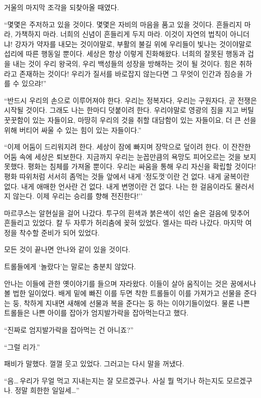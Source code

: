 거울의 마지막 조각을 되찾아올 때였다.

``몇몇은 주저하고 있을 것이다. 몇몇은 자비의 마음을 품고 있을 것이다. 흔들리지 마라, 가책하지 마라. 너희의 신념이 흔들리게 두지 마라. 이것이 자연의 법칙이 아니더냐! 강자가 약자를 내모는 것이야말로, 부활의 불길 위에 우리들이 빛나는 것이야말로 섭리에 따른 행동일 뿐이다. 세상은 항상 이렇게 진화해왔다. 너희의 잘못된 행동과 겁을 내는 것이 우리 왕국의, 우리 백성들의 성장을 방해하는 것이 될 것이다. 힘은 취하라고 존재하는 것이다! 우리가 질서를 바로잡지 않는다면 그 무엇이 인간과 짐승을 가를 수 있으랴!''

``반드시 우리의 손으로 이루어져야 한다. 우리는 정복자다, 우리는 구원자다, 곧 전쟁은 시작될 것이다. 그래도 나는 한마디 덧붙이려 한다. 우리야말로 영광의 짐을 지고 버틸 꿋꿋함이 있는 자들이요, 마땅히 우리의 것을 취할 대담함이 있는 자들이요, 더 큰 선을 위해 버티어 싸울 수 있는 힘이 있는 자들이다.''

``이제 어둠이 드리워지려 한다. 세상이 잠에 빠지며 장막으로 덮이려 한다. 이 잔잔한 어둠 속에 세상은 퇴보한다. 지금까지 우리는 눈꼽만큼의 욕망도 피어오르는 것을 보지 못했다. 평화는 침체를 가져올 뿐이다. 우리는 싸움을 통해 우리 자신을 확립할 것이다! 평화 따위처럼 서서히 좀먹는 것들 앞에서 내게 `정도껏'이란 건 없다. 내게 굴복이란 없다. 내게 애매한 언사란 건 없다. 내게 변명이란 건 없다. 나는 한 걸음이라도 물러서지 않는다. 이제 우리는 승리를 향해 전진한다!''

마르쿠스는 알현실을 걸어 나갔다. 투구의 흰색과 붉은색이 섞인 술은 걸음에 맞추어 흔들리고 있었다. 칼 두 자루가 허리춤에 꽂혀 있었다. 엘사는 따라 나갔다. 마지막 여정을 착수할 준비가 되어 있었다.

모든 것이 끝나면 안나와 같이 있을 것이다.

\textbreak

트롤들에게 `놀랐다'는 말로는 충분치 않았다.

안나는 이들에 관한 옛이야기를 들으며 자라왔다. 이들이 살아 움직이는 것은 꿈에서나 볼 법한 일이었다. 배게 밑에 빠진 이를 두면 착한 트롤들이 이를 가져가고 선물을 준다는 둥, 착하게 지내면 새해에 선물과 복을 준다는 둥 하는 이야기들이었다. 물론 나쁜 트롤들은 나쁜 아이를 잡아가 엄지발가락을 잡아먹는다고 했다.

``진짜로 엄지발가락을 잡아먹는 건 아니죠?''

``그럴 리가.''

패비가 말했다. 껄껄 웃고 있었다. 그러고는 다시 말을 꺼냈다.

``음\ldots\,우리가 무얼 먹고 지내는지는 잘 모르겠구나. 사실 뭘 먹기나 하는지도 모르겠구나. 정말 희한한 일일세\ldots''

